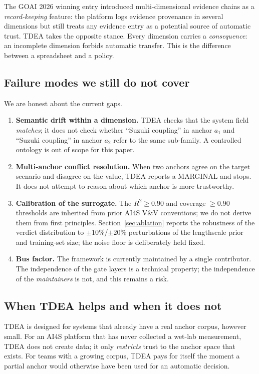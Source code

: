 \documentclass[review,3p]{elsarticle}
\begin{document}
The GOAI 2026 winning entry introduced multi-dimensional evidence chains as a \emph{record-keeping} feature: the platform logs evidence provenance in several dimensions but still treats any evidence entry as a potential source of automatic trust. TDEA takes the opposite stance. Every dimension carries a \emph{consequence}: an incomplete dimension forbids automatic transfer. This is the difference between a spreadsheet and a policy.

\subsection{Failure modes we still do not cover}
\label{sec:disc-limits}

We are honest about the current gaps.
\begin{enumerate}
    \item \textbf{Semantic drift within a dimension.} TDEA checks that the system field \emph{matches}; it does not check whether ``Suzuki coupling'' in anchor $a_1$ and ``Suzuki coupling'' in anchor $a_2$ refer to the same sub-family. A controlled ontology is out of scope for this paper.
    \item \textbf{Multi-anchor conflict resolution.} When two anchors agree on the target scenario and disagree on the value, TDEA reports a MARGINAL and stops. It does not attempt to reason about which anchor is more trustworthy.
    \item \textbf{Calibration of the surrogate.} The $R^2 \ge 0.90$ and coverage $\ge 0.90$ thresholds are inherited from prior AI4S V\&V conventions; we do not derive them from first principles. Section~\ref{sec:ablation} reports the robustness of the verdict distribution to $\pm10\%$/$\pm20\%$ perturbations of the lengthscale prior and training-set size; the noise floor is deliberately held fixed.
    \item \textbf{Bus factor.} The framework is currently maintained by a single contributor. The independence of the gate layers is a technical property; the independence of the \emph{maintainers} is not, and this remains a risk.
\end{enumerate}

\subsection{When TDEA helps and when it does not}
\label{sec:disc-fit}

TDEA is designed for systems that already have a real anchor corpus, however small. For an AI4S platform that has never collected a wet-lab measurement, TDEA does not create data; it only \emph{restricts} trust to the anchor space that exists. For teams with a growing corpus, TDEA pays for itself the moment a partial anchor would otherwise have been used for an automatic decision.
\end{document}
